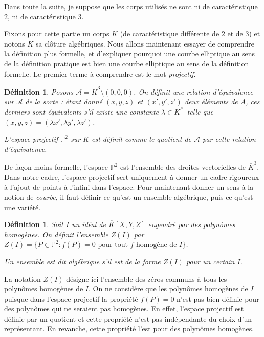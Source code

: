 \documentclass{article}
\theoremstyle{plain}%
\newtheorem{deff}[thm]{Définition}
\theoremstyle{definition}%
\newcommand{\ol}{\overline}
\begin{document}
\begin{center}
  \color{red}
  Dans toute la suite, je suppose que les corps utilisés ne sont ni de caractéristique $2$, ni de caractéristique $3$.
\end{center}

Fixons pour cette partie un corps $K$ (de caractéristique différente de $2$ et de $3$) et notons $\overline{K}$ sa clôture algébriques. Nous allons maintenant essayer de comprendre la définition plus formelle, et d'expliquer pourquoi une courbe elliptique au sens de la définition pratique est bien une courbe elliptique au sens de la définition formelle. Le premier terme à comprendre est le mot \emph{projectif}.

\begin{deff}
  Posons $\mathcal{A} = \ol K^3\setminus(0, 0, 0)$. On définit une relation d'équivalence sur $\mathcal A$ de la sorte : étant donné $(x, y, z)$ et $(x', y', z')$ deux éléments de $A$, ces derniers sont équivalents s'il existe une constante $\lambda\in\ol K^\times$ telle que $(x, y, z) = (\lambda x', \lambda y', \lambda z')$.

  L'espace projectif $\mathbb P^2$ sur $K$ est définit comme le quotient de $\mathcal A$ par cette relation d'équivalence. 
\end{deff}

De façon moins formelle, l'espace $\mathbb P^2$ est l'ensemble des droites vectorielles de $\ol K^3$. Dans notre cadre, l'espace projectif sert uniquement à donner un cadre rigoureux à l'ajout de points à l'infini dans l'espace. Pour maintenant donner un sens à la notion de \emph{courbe}, il faut définir ce qu'est un ensemble algébrique, puis ce qu'est une variété.

\begin{deff}
  Soit $I$ un idéal de $\ol K[X, Y, Z]$ engendré par des polynômes homogènes. On définit l'ensemble $Z(I)$ par $Z(I) = \{ P\in \mathbb{P}^2 : f(P) = 0 \text{ pour tout } f \text{ homogène de } I \}$.

  Un ensemble est dit algébrique s'il est de la forme $Z(I)$ pour un certain $I$.
\end{deff}

La notation $Z(I)$ désigne ici l'ensemble des zéros communs à tous les polynômes homogènes de $I$. On ne considère que les polynômes homogènes de $I$ puisque dans l'espace projectif la propriété $f(P) = 0$ n'est pas bien définie pour des polynômes qui ne seraient pas homogènes. 
En effet, l'espace projectif est définie par un quotient et cette propriété n'est pas indépendante du choix d'un représentant. En revanche, cette propriété l'est pour des polynômes homogènes.
\end{document}
